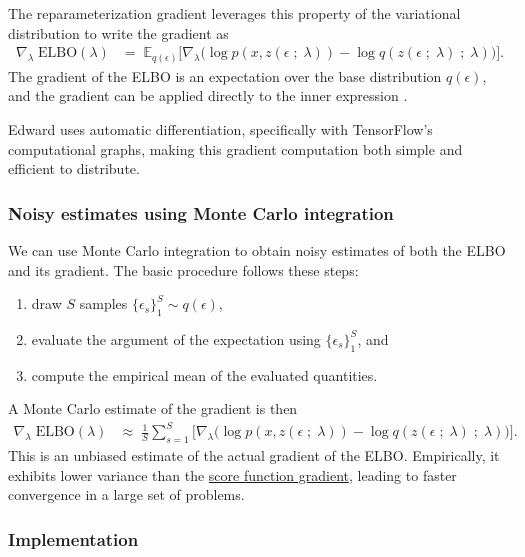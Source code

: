The reparameterization gradient leverages this property of the
variational distribution to write the gradient as
\begin{align*}
  \nabla_\lambda\;
  \text{ELBO}(\lambda)
  &=\;
  \mathbb{E}_{q(\epsilon)}
  \big[
  \nabla_\lambda
  \big(
  \log p(x, z(\epsilon \;;\; \lambda))
  -
  \log q(z(\epsilon \;;\; \lambda) \;;\;\lambda)
  \big)
  \big].
\end{align*}
The gradient of the ELBO is an expectation over the base
distribution $q(\epsilon)$, and the gradient can be applied directly
to the inner expression
\citep{rezende2014stochastic,kingma2014auto}.


Edward uses automatic differentiation, specifically with TensorFlow's
computational graphs, making this gradient computation both simple and
efficient to distribute.

\subsubsection{Noisy estimates using Monte Carlo integration}

We can use Monte Carlo integration to obtain noisy estimates of both the ELBO
and its gradient. The basic procedure follows these steps:
\begin{enumerate}
  \item draw $S$ samples $\{\epsilon_s\}_1^S \sim q(\epsilon)$,
  \item evaluate the argument of the expectation using $\{\epsilon_s\}_1^S$, and
  \item compute the empirical mean of the evaluated quantities.
\end{enumerate}

A Monte Carlo estimate of the gradient is then
\begin{align*}
  \nabla_\lambda\;
  \text{ELBO}(\lambda)
  &\approx\;
  \frac{1}{S}
  \sum_{s=1}^{S}
  \big[
  \nabla_\lambda
  \big(
  \log p(x, z(\epsilon \;;\; \lambda))
  -
  \log q(z(\epsilon \;;\; \lambda) \;;\;\lambda)
  \big)
  \big].
\end{align*}
This is an unbiased estimate of the actual gradient of the ELBO. Empirically, it
exhibits lower variance than the
\href{/tutorials/klqp-score}{score function gradient}, leading to
faster convergence in a large set of problems.

\subsubsection{Implementation}

